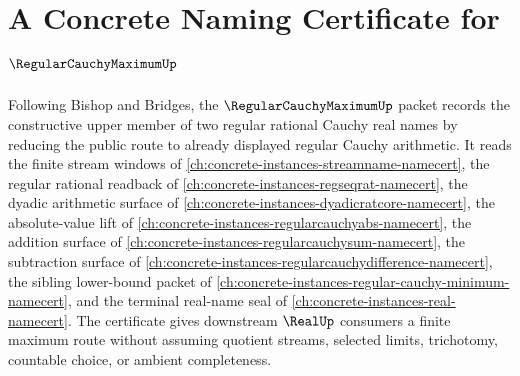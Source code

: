 \chapter{A Concrete Naming Certificate for $\RegularCauchyMaximumUp$}
\label{ch:concrete-instances-regular-cauchy-maximum-namecert}

Following Bishop and Bridges, the $\RegularCauchyMaximumUp$ packet records the constructive upper member of two regular rational Cauchy real names by reducing the public route to already displayed regular Cauchy arithmetic. It reads the finite stream windows of \autoref{ch:concrete-instances-streamname-namecert}, the regular rational readback of \autoref{ch:concrete-instances-regseqrat-namecert}, the dyadic arithmetic surface of \autoref{ch:concrete-instances-dyadicratcore-namecert}, the absolute-value lift of \autoref{ch:concrete-instances-regularcauchyabs-namecert}, the addition surface of \autoref{ch:concrete-instances-regularcauchysum-namecert}, the subtraction surface of \autoref{ch:concrete-instances-regularcauchydifference-namecert}, the sibling lower-bound packet of \autoref{ch:concrete-instances-regular-cauchy-minimum-namecert}, and the terminal real-name seal of \autoref{ch:concrete-instances-real-namecert}. The certificate gives downstream $\RealUp$ consumers a finite maximum route without assuming quotient streams, selected limits, trichotomy, countable choice, or ambient completeness.


